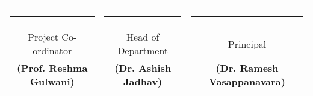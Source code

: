 \vspace{-0.2in}
\begin{center}
\begin{tabular}{ccc}

      \noindent\rule{4cm}{0.5pt} & \hspace{0.5in}\noindent\rule{4cm}{0.5pt} & \hspace{0.12in}\noindent\rule{4cm}{0.5pt} \\
      \small{Project Co-ordinator} & \hspace{0.5in}\small{Head of Department} & \hspace{0.12in}\small{Principal} \\
   \small{\textbf{(Prof. Reshma Gulwani)}}& \hspace{0.5in}\small{\textbf{(Dr. Ashish Jadhav)}} & \hspace{0.25in}\small{\textbf{(Dr. Ramesh Vasappanavara)}} \\
    \end{tabular}
\end{center}

